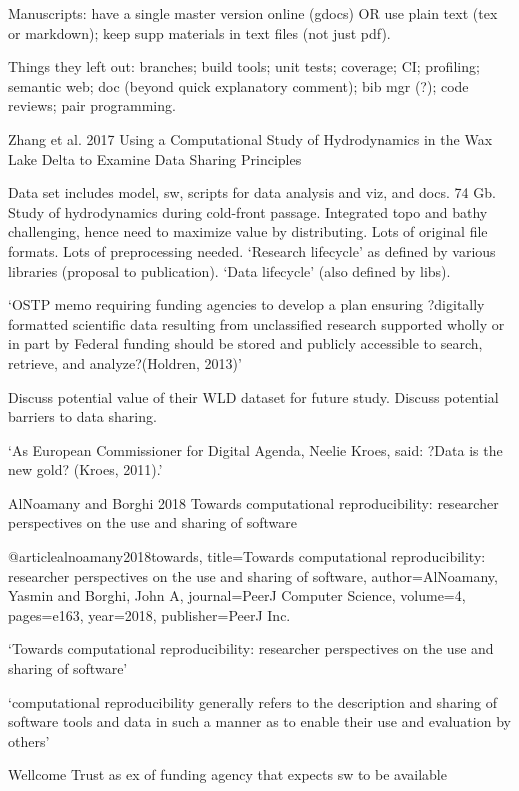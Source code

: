 \documentclass[12pt]{amsart}
\begin{document}
Manuscripts: have a single master version online (gdocs) OR use plain text (tex or markdown); keep supp materials in text files (not just pdf).

Things they left out: branches; build tools; unit tests; coverage; CI; profiling; semantic web; doc (beyond quick explanatory comment); bib mgr (?); code reviews; pair programming. 



Zhang et al. 2017 Using a Computational Study of Hydrodynamics in the
Wax Lake Delta to Examine Data Sharing Principles

Data set includes model, sw, scripts for data analysis and viz, and docs. 74 Gb. Study of hydrodynamics during cold-front passage. Integrated topo and bathy challenging, hence need to maximize value by distributing. Lots of original file formats. Lots of preprocessing needed. `Research lifecycle' as defined by various libraries (proposal to publication). `Data lifecycle' (also defined by libs). 

`OSTP memo requiring funding agencies to develop a plan ensuring ?digitally formatted scientific data resulting from unclassified research supported wholly or in part by Federal funding should be stored and publicly accessible to search, retrieve, and analyze?(Holdren, 2013)'

Discuss potential value of their WLD dataset for future study. Discuss potential barriers to data sharing.

`As European Commissioner for Digital Agenda, Neelie Kroes, said: ?Data is the new gold? (Kroes, 2011).'



AlNoamany and Borghi 2018 Towards computational reproducibility: researcher perspectives on the use and sharing of software

@article{alnoamany2018towards,
  title={Towards computational reproducibility: researcher perspectives on the use and sharing of software},
  author={AlNoamany, Yasmin and Borghi, John A},
  journal={PeerJ Computer Science},
  volume={4},
  pages={e163},
  year={2018},
  publisher={PeerJ Inc.}
}

`Towards computational reproducibility: researcher perspectives on the use and sharing of software'

`computational reproducibility generally refers to the description and sharing of software tools and data in such a manner as to enable their use and evaluation by others'

Wellcome Trust as ex of funding agency that expects sw to be available
\end{document}
